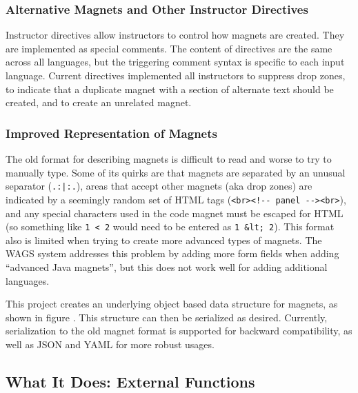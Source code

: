 \documentclass[letter,10pt]{article}
\begin{document}
\subsubsection{Alternative Magnets and Other Instructor Directives}

Instructor directives allow instructors to control how magnets are 
created. They are implemented as special comments. The 
content of directives are the same across all languages, but the 
triggering comment syntax is specific to each input language. Current 
directives implemented all instructors to suppress drop zones, to 
indicate that a duplicate magnet with a section of alternate text 
should be created, and to create an unrelated magnet.


\subsubsection{Improved Representation of Magnets}

The old format for describing magnets is difficult to read and worse to 
try to manually type. Some of its quirks are that magnets are separated 
by an unusual separator (\verb~.:|:.~), areas that accept other magnets 
(aka drop zones) are indicated by a seemingly random set of HTML tags 
(\verb~<br><!-- panel --><br>~), and any special characters used in the 
code magnet must be escaped for HTML (so something like \verb~1 < 2~ 
would need to be entered as \verb~1 &lt; 2~). This format also is 
limited when trying to create more advanced types of magnets. The WAGS 
system addresses this problem by adding more form fields when adding 
``advanced Java magnets'', but this does not work well for adding 
additional languages.


This project creates an underlying object based data structure for 
magnets, as shown in figure . This 
structure can then be serialized as desired. Currently, serialization to 
the old magnet format is supported for backward compatibility, as well 
as JSON and YAML for more robust usages.



\subsection{What It Does: External Functions}
\end{document}
